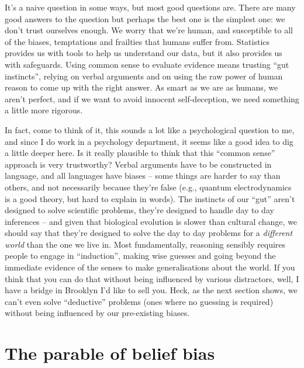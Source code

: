 \documentclass[]{book}
\begin{document}
It's a naive question in some ways, but most good questions are. There are many good answers to the question but perhaps the best one is the simplest one: we don't trust ourselves enough. We worry that we're human, and susceptible to all of the biases, temptations and frailties that humans suffer from. Statistics provides us with tools to help us understand our data, but it also provides us with safeguards. Using common sense to evaluate evidence means trusting ``gut instincts'', relying on verbal arguments and on using the raw power of human reason to come up with the right answer. As smart as we are as humans, we aren't perfect, and if we want to avoid innocent self-deception, we need something a little more rigorous.

In fact, come to think of it, this sounds a lot like a psychological question to me, and since I do work in a psychology department, it seems like a good idea to dig a little deeper here. Is it really plausible to think that this ``common sense'' approach is very trustworthy? Verbal arguments have to be constructed in language, and all languages have biases -- some things are harder to say than others, and not necessarily because they're false (e.g., quantum electrodynamics is a good theory, but hard to explain in words). The instincts of our ``gut'' aren't designed to solve scientific problems, they're designed to handle day to day inferences -- and given that biological evolution is slower than cultural change, we should say that they're designed to solve the day to day problems for a \emph{different world} than the one we live in. Most fundamentally, reasoning sensibly requires people to engage in ``induction'', making wise guesses and going beyond the immediate evidence of the senses to make generalisations about the world. If you think that you can do that without being influenced by various distractors, well, I have a bridge in Brooklyn I'd like to sell you. Heck, as the next section shows, we can't even solve ``deductive'' problems (ones where no guessing is required) without being influenced by our pre-existing biases.

\hypertarget{the-parable-of-belief-bias}{%
\section{The parable of belief bias}\label{the-parable-of-belief-bias}}
\end{document}
